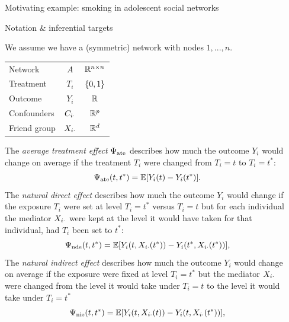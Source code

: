 \documentclass[final]{beamer}
\newlength{\sepwidth}
\newlength{\colwidth}
\newcommand{\separatorcolumn}{\begin{column}{\sepwidth}\end{column}}
\begin{document}
\begin{frame}[t]
\begin{columns}[t]
\begin{column}{\colwidth}
\begin{block}{Motivating example: smoking in adolescent social networks}
\end{block}


\begin{block}{Notation \& inferential targets}

  We assume we have a (symmetric) network with nodes $1, ..., n$.

  \begin{table}[]
    \begin{tabular}{lcc}
    Network   & $A$                    & $\mathbb{R}^{n \times n}$ \\
    Treatment & $T_i$                & $\{0, 1\} $               \\
    Outcome   & $Y_i$                & $\mathbb{R}$                \\
    Confounders & $C_{i \cdot}$ &  $\mathbb{R}^p$                \\
    Friend group & $X_{i \cdot}$ & $\mathbb{R}^d$               
    \end{tabular}
  \end{table}

  The \emph{average treatment effect} $\Psi_\mathrm{ate}$ describes how much the outcome $Y_i$ would change on average if the treatment $T_i$ were changed from $T_i = t$ to $T_i = t^*$:
  \begin{equation*}
      \atef = \E{Y_i(t) - Y_i(t^*)}.
  \end{equation*}
  The \emph{natural direct effect} describes how much the outcome $Y_i$ would change if the exposure $T_i$ were set at level $T_i = t^*$ versus $T_i = t$ but for each individual the mediator $X_{i \cdot}$ were kept at the level it would have taken for that individual, had $T_i$ been set to $t^*$:
  \begin{equation*}
      \ndef = \E{Y_i(t, \X_{i \cdot}(t^*)) - Y_i(t^*, \X_{i \cdot}(t^*))},
  \end{equation*}
  The \emph{natural indirect effect} describes how much the outcome $Y_i$ would change on average if the exposure were fixed at level $T_i = t^*$ but the mediator $X_{i \cdot}$ were changed from the level it would take under $T_i = t$ to the level it would take under $T_i = t^*$
  \begin{equation*}
      \nief = \E{Y_i(t, \X_{i \cdot}(t)) - Y_i(t, \X_{i \cdot}(t^*))},
  \end{equation*}

\end{block}

\end{column}

\separatorcolumn


\end{columns}
\end{frame}
\end{document}
